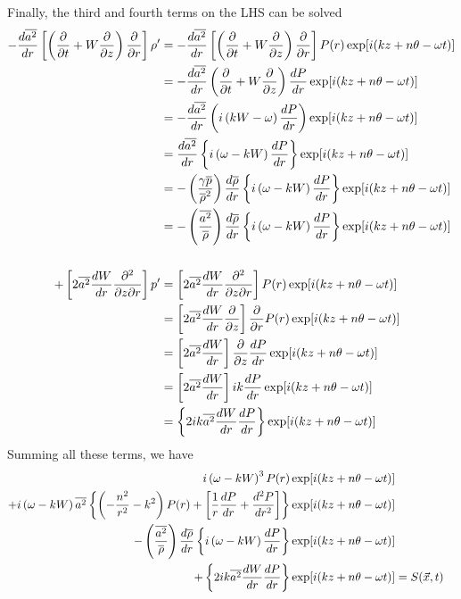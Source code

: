 \documentclass[onecolumn,10pt]{jhwhw}
\begin{document}
Finally, the third and fourth terms on the LHS can be solved
\begin{align*}
- \dfrac{d \overline{a^2}}{dr} \left [ \left ( \dfrac{\partial}{\partial t} + W \dfrac{\partial}{\partial z} \right) \dfrac{\partial}{\partial r} \right ] \rho^{\prime} &= - \dfrac{d \overline{a^2}}{dr} \left [ \left ( \dfrac{\partial}{\partial t} + W \dfrac{\partial}{\partial z} \right) \dfrac{\partial}{\partial r} \right ] P(r) \exp[i(kz+n \theta - \omega t)] \\
&= - \dfrac{d \overline{a^2}}{dr} \left ( \dfrac{\partial}{\partial t} + W \dfrac{\partial}{\partial z} \right ) \dfrac{d P}{dr} \exp[i(kz+n \theta - \omega t)] \\
&= - \dfrac{d \overline{a^2}}{dr} \left ( i \left ( k W - \omega \right ) \dfrac{d P}{dr} \right ) \exp[i(kz+n \theta - \omega t)] \\
&= \dfrac{d \overline{a^2}}{dr} \left \{ i \left ( \omega - k W \right ) \dfrac{d P}{dr} \right \} \exp[i(kz+n \theta - \omega t)] \\
&= -\left(\dfrac{\gamma \overline{p}}{\overline{\rho}^2}\right) \frac{d \overline{\rho}}{dr} \left \{ i \left ( \omega - k W \right ) \dfrac{d P}{dr} \right \} \exp[i(kz+n \theta - \omega t)] \\
&= -\left(\dfrac{\overline{a^2}}{\overline{\rho}}\right) \frac{d \overline{\rho}}{dr} \left \{ i \left ( \omega - k W \right ) \dfrac{d P}{dr} \right \} \exp[i(kz+n \theta - \omega t)] \\
\\
+\left [ 2 \overline{a^2} \dfrac{dW}{dr} \dfrac{\partial^2 }{\partial z \partial r} \right ] p^{\prime} &= \left [ 2 \overline{a^2} \dfrac{dW}{dr} \dfrac{\partial^2 }{\partial z \partial r} \right ] P(r) \exp[i(kz+n \theta - \omega t)] \\
&= \left [ 2 \overline{a^2} \dfrac{dW}{dr} \dfrac{\partial }{\partial z} \right ] \dfrac{\partial}{\partial r} P(r) \exp[i(kz+n \theta - \omega t)] \\
&= \left [ 2 \overline{a^2} \dfrac{dW}{dr} \right ] \dfrac{\partial}{\partial z} \dfrac{d P}{d r} \exp[i(kz+n \theta - \omega t)] \\
&= \left [ 2 \overline{a^2} \dfrac{dW}{dr} \right ] ik \dfrac{d P}{d r} \exp[i(kz+n \theta - \omega t)] \\
&= \left \{ 2 ik \overline{a^2} \dfrac{dW}{dr} \dfrac{d P}{d r} \right \} \exp[i(kz+n \theta - \omega t)]
\end{align*}
Summing all these terms, we have
\begin{align*}
i \left ( \omega-k W \right)^3 P(r) \exp[i(kz+n \theta - \omega t)] \\
+ i \left( \omega - k W \right) \overline{a^2} \left \{ \left ( -\dfrac{n^2}{r^2} -k^2 \right ) P(r) + \left [ \dfrac{1}{r} \dfrac{d P} {d r} + \dfrac{d^2 P} {d r^2} \right ] \right \} \exp[i(kz+n \theta - \omega t)] \\
- \left(\dfrac{\overline{a^2}}{\overline{\rho}}\right) \frac{d \overline{\rho}}{dr} \left \{ i \left ( \omega - k W \right ) \dfrac{d P}{dr} \right \} \exp[i(kz+n \theta - \omega t)] \\
+ \left \{ 2 ik \overline{a^2} \dfrac{dW}{dr} \dfrac{d P}{d r} \right \} \exp[i(kz+n \theta - \omega t)] &= S(\vec{x}, t)
\end{align*}
\end{document}
